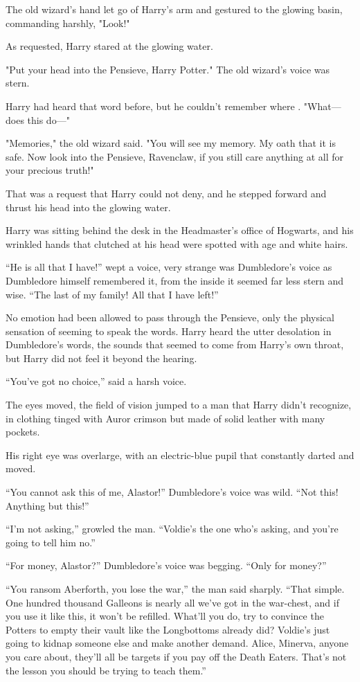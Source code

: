 The old wizard's hand let go of Harry's arm and gestured to the glowing basin,
commanding harshly, "Look!"

As requested, Harry stared at the glowing water.

"Put your head into the Pensieve, Harry Potter." The old wizard's voice was
stern.

Harry had heard that word before, but he couldn't remember where . "What---does
this do---"

"Memories," the old wizard said. "You will see my memory. My oath that it is
safe. Now look into the Pensieve, Ravenclaw, if you still care anything at all
for your precious truth!"

That was a request that Harry could not deny, and he stepped forward and thrust
his head into the glowing water.
\later
\begin{em}
Harry was sitting behind the desk in the Headmaster's office of Hogwarts,
and his wrinkled hands that clutched at his head were spotted with age and
white hairs.

``He is all that I have!'' wept a voice, very strange was Dumbledore's
voice as Dumbledore himself remembered it, from the inside it seemed far less
stern and wise. ``The last of my family! All that I have left!''

No emotion had been allowed to pass through the Pensieve, only the
physical sensation of seeming to speak the words. Harry heard the utter
desolation in Dumbledore's words, the sounds that seemed to come from Harry's
own throat, but Harry did not feel it beyond the hearing.

``You've got no choice,'' said a harsh voice.

The eyes moved, the field of vision jumped to a man that Harry didn't
recognize, in clothing tinged with Auror crimson but made of solid leather with
many pockets.

His right eye was overlarge, with an electric-blue pupil that constantly
darted and moved.

``You cannot ask this of me, Alastor!'' Dumbledore's voice was wild. ``Not
this! Anything but this!''

``I'm not asking,'' growled the man. ``Voldie's the one who's asking, and
you're going to tell him no.''

``For money, Alastor?'' Dumbledore's voice was begging. ``Only for money?''

``You ransom Aberforth, you lose the war,'' the man said sharply. ``That
simple. One hundred thousand Galleons is nearly all we've got in the war-chest,
and if you use it like this, it won't be refilled. What'll you do, try to
convince the Potters to empty their vault like the Longbottoms already did?
Voldie's just going to kidnap someone else and make another demand. Alice,
Minerva, anyone you care about, they'll all be targets if you pay off the Death
Eaters. That's not the lesson you should be trying to teach them.''


\end{em}
